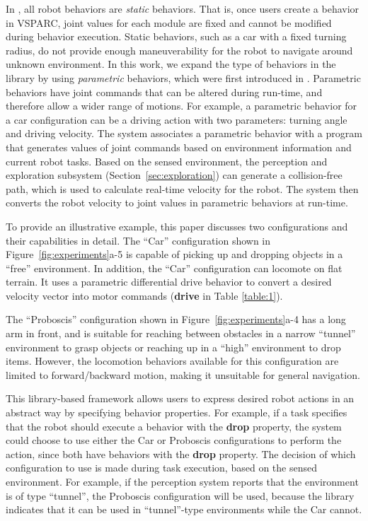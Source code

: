 \documentclass[12pt]{article}
\begin{document}
In \cite{Jing2016}, all robot behaviors are \textit{static} behaviors.
That is, once users create a behavior in VSPARC, joint values for each module are fixed and cannot be modified during behavior execution.
Static behaviors, such as a car with a fixed turning radius, do not provide enough maneuverability for the robot to navigate around unknown environment.
In this work, we expand the type of behaviors in the library by using \textit{parametric} behaviors, which were first introduced in \cite{JingAURO2017}.
Parametric behaviors have joint commands that can be altered during run-time, and therefore allow a wider range of motions.
For example, a parametric behavior for a car configuration can be a driving action with two parameters: turning angle and driving velocity.  
The system associates a parametric behavior with a program that generates values of joint commands based on environment information and current robot tasks.
Based on the sensed environment, the perception and exploration subsystem (Section~\ref{sec:exploration}) can generate a collision-free path, which is used to calculate real-time velocity for the robot.
The system then converts the robot velocity to joint values in parametric behaviors at run-time.

To provide an illustrative example, this paper discusses two configurations and their capabilities in detail.
The ``Car'' configuration shown in Figure~\ref{fig:experiments}a-5 is capable of picking
up and dropping objects in a ``free'' environment. In addition, the ``Car'' configuration can locomote on flat terrain. It uses a parametric differential drive behavior to convert a desired velocity vector into motor commands (\textbf{drive} in Table \ref{table:1}).

The ``Proboscis'' configuration shown in Figure~\ref{fig:experiments}a-4 has
a long arm in front, and is suitable for reaching between obstacles in a narrow ``tunnel'' environment to grasp objects or reaching up in a ``high'' environment to drop items.
However, the locomotion behaviors available for this configuration are limited to forward/backward motion, making it unsuitable for general navigation.

This library-based framework allows users to express desired robot actions in an abstract way by specifying behavior properties. For example, if a task specifies that the robot should execute a behavior with the \textbf{drop} property, the system could choose to use either the Car or Proboscis configurations to perform the action, since both have behaviors with the \textbf{drop} property.
The decision of which configuration to use is made during task execution, based on the sensed environment.
For example, if the perception system reports that the environment is of type ``tunnel'', the Proboscis configuration will be used, because the library indicates that it can be used in ``tunnel''-type environments while the Car cannot.
\end{document}
